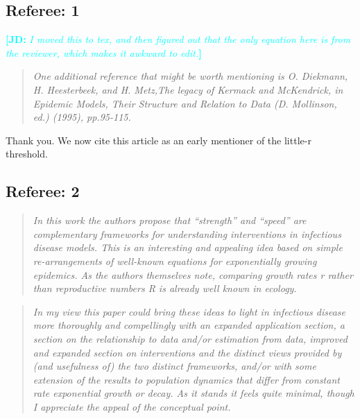 \newcommand{\RR}{\ensuremath{{\mathcal R}}}
\newcommand{\Rhat}{\ensuremath{{\hat\RR}}}
\newcommand{\rr}{\ensuremath{{r}}}

\newcommand{\comment}{RENEW the comment command}
\renewcommand{\comment}[3]{}
\renewcommand{\comment}[3]{\textcolor{#1}{\textbf{[#2: }\textit{#3}\textbf{]}}}
\newcommand{\jd}[1]{\comment{cyan}{JD}{#1}}
\newcommand{\swp}[1]{\comment{magenta}{SWP}{#1}}

\hypertarget{referee-1}{%
\subsection{Referee: 1}\label{referee-1}}

\jd{I moved this to tex, and then figured out that the only equation here is from the reviewer, which makes it awkward to edit.}

\begin{quote}\sl
One additional reference that might be worth mentioning is O. Diekmann,
H. Heesterbeek, and H. Metz,The legacy of Kermack and McKendrick, in
Epidemic Models, Their Structure and Relation to Data (D. Mollinson,
ed.) (1995), pp.95-115.
\end{quote}

Thank you. We now cite this article as an early mentioner of the
little-r threshold.

\hypertarget{referee-2}{%
\subsection{Referee: 2}\label{referee-2}}

\begin{quote}\sl
In this work the authors propose that ``strength'' and ``speed'' are
complementary frameworks for understanding interventions in infectious
disease models. This is an interesting and appealing idea based on
simple re-arrangements of well-known equations for exponentially growing
epidemics. As the authors themselves note, comparing growth rates r
rather than reproductive numbers R is already well known in ecology.
\end{quote}

\begin{quote}\sl
In my view this paper could bring these ideas to light in infectious
disease more thoroughly and compellingly with an expanded application
section, a section on the relationship to data and/or estimation from
data, improved and expanded section on interventions and the distinct
views provided by (and usefulness of) the two distinct frameworks,
and/or with some extension of the results to population dynamics that
differ from constant rate exponential growth or decay. As it stands it
feels quite minimal, though I appreciate the appeal of the conceptual
point.
\end{quote}

